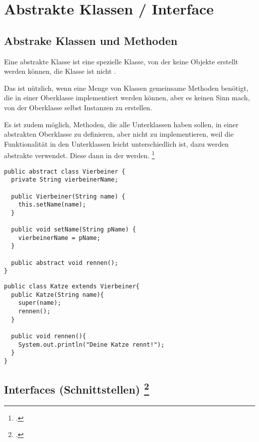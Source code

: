 \documentclass{bschlangaul-haupt}
\begin{document}
\chapter{Abstrakte Klassen / Interface}

\cite[Vererbung Seite 28-31 (PDF Seite 156-159)]{brinda}

\section{Abstrake Klassen und Methoden}

Eine abstrakte Klasse ist eine spezielle Klasse, von der keine Objekte
erstellt werden können, \dh die Klasse ist nicht .

Das ist nützlich, wenn eine Menge von Klassen gemeinsame Methoden
benötigt, die in einer Oberklasse implementiert werden können, aber es
keinen Sinn mach, von der Oberklasse selbst Instanzen zu erstellen.

Es ist zudem möglich, Methoden, die alle Unterklassen haben sollen, in
einer abstrakten Oberklasse zu definieren, aber nicht zu implementieren,
weil die Funktionalität in den Unterklassen leicht unterschiedlich ist,
dazu werden abstrakte  verwendet. Diese 
dann in der  werden.
\footcite[Seite 31]{oomup:fs:3}

\begin{verbatim}
public abstract class Vierbeiner {
  private String vierbeinerName;

  public Vierbeiner(String name) {
    this.setName(name);
  }

  public void setName(String pName) {
    vierbeinerName = pName;
  }

  public abstract void rennen();
}
\end{verbatim}

\begin{verbatim}
public class Katze extends Vierbeiner{
  public Katze(String name){
    super(name);
    rennen();
  }

  public void rennen(){
    System.out.println("Deine Katze rennt!");
  }
}
\end{verbatim}

\section{Interfaces (Schnittstellen)
\footcite[Vererbung Seite 32-38 (PDF Seite 160-166)]{brinda}}
\end{document}
